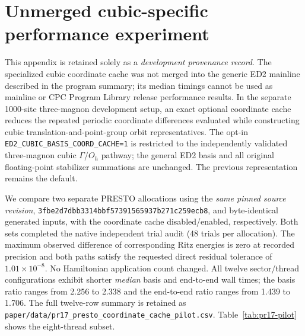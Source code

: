 \documentclass[preprint,12pt,nopreprintline]{elsarticle}
\begin{document}
\section{Unmerged cubic-specific performance experiment}
\label{sec:pr17-pilot}
This appendix is retained solely as a \emph{development provenance
record}. The specialized cubic coordinate cache was not merged
into the generic ED2 mainline described in the program summary;
its median timings cannot be used as mainline or
CPC Program Library release performance results.
In the separate 1000-site three-magnon development setup, an
exact optional coordinate cache reduces the repeated periodic
coordinate differences evaluated while constructing cubic
translation-and-point-group orbit representatives. The
opt-in \texttt{ED2\_CUBIC\_BASIS\_COORD\_CACHE=1} is restricted
to the independently validated three-magnon cubic
$\Gamma$/$O_h$ pathway; the general ED2 basis and all
original floating-point stabilizer summations are unchanged.
The previous representation remains the default.

We compare two separate PRESTO allocations using the
\emph{same pinned source revision},
\texttt{3fbe2d7dbb3314bbf57391565937b271c259ecb8},
and byte-identical generated inputs, with the coordinate
cache disabled/enabled, respectively. Both sets completed
the native independent trial audit (48 trials per allocation).
The maximum observed difference of corresponding Ritz
energies is zero at recorded precision and both paths
satisfy the requested direct residual tolerance of
$1.01\times10^{-8}$. No Hamiltonian application count
changed. All twelve sector/thread configurations exhibit
shorter \emph{median} basis and end-to-end wall times;
the basis ratio ranges from 2.256 to 2.338 and
the end-to-end ratio ranges from 1.439 to 1.706.
The full twelve-row summary is retained as
\texttt{paper/data/pr17\_presto\_coordinate\_cache\_pilot.csv}.
Table~\ref{tab:pr17-pilot} shows the eight-thread subset.
\end{document}
